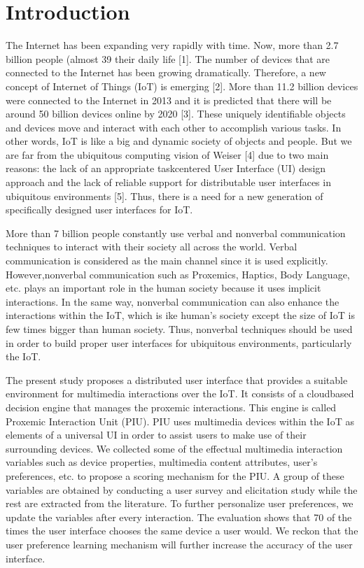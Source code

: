 \documentclass[runningheads,a4paper]{llncs}
\begin{document}
\section{Introduction}

The Internet has been expanding very rapidly with time. Now, more than 2.7
billion people (almost 39%
their daily life [1]. The number of devices that are connected to the Internet has
been growing dramatically. Therefore, a new concept of Internet of Things (IoT)
is emerging [2]. More than 11.2 billion devices were connected to the Internet in
2013 and it is predicted that there will be around 50 billion devices online by 2020
[3]. These uniquely identifiable objects and devices move and interact with each
other to accomplish various tasks. In other words, IoT is like a big and dynamic
society of objects and people. But we are far from the ubiquitous computing
vision of Weiser [4] due to two main reasons: the lack of an appropriate taskcentered User Interface (UI) design approach and the lack of reliable support
for distributable user interfaces in ubiquitous environments [5]. Thus, there is a
need for a new generation of specifically designed user interfaces for IoT.



More than 7 billion people constantly use verbal and nonverbal communication techniques to interact with their society all across the world. Verbal communication is considered as the main channel since it is used explicitly. However,nonverbal communication such as Proxemics, Haptics, Body Language, etc. plays
an important role in the human society because it uses implicit interactions. In
the same way, nonverbal communication can also enhance the interactions within
the IoT, which is ike human’s society except the size of IoT is few times bigger
than human society. Thus, nonverbal techniques should be used in order to build
proper user interfaces for ubiquitous environments, particularly the IoT.



The present study proposes a distributed user interface that provides a suitable environment for multimedia interactions over the IoT. It consists of a cloudbased decision engine that manages the proxemic interactions. This engine is
called Proxemic Interaction Unit (PIU). PIU uses multimedia devices within
the IoT as elements of a universal UI in order to assist users to make use of
their surrounding devices. We collected some of the effectual multimedia interaction variables such as device properties, multimedia content attributes, user’s
preferences, etc. to propose a scoring mechanism for the PIU. A group of these
variables are obtained by conducting a user survey and elicitation study while
the rest are extracted from the literature. To further personalize user preferences,
we update the variables after every interaction. The evaluation shows that 70%
of the times the user interface chooses the same device a user would. We reckon
that the user preference learning mechanism will further increase the accuracy
of the user interface.
\end{document}
